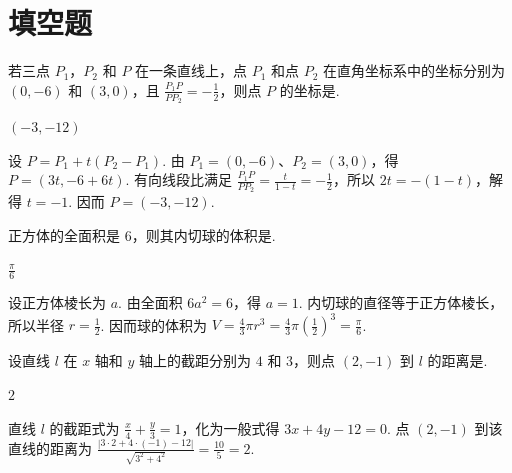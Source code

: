 \section{填空题}

\begin{problem}

若三点 \(P_{1}\)，\(P_{2}\) 和 \(P\) 在一条直线上，点 \(P_{1}\) 和点 \(P_{2}\) 在直角坐标系中的坐标分别为 \((0,-6)\) 和 \((3,0)\)，且 \(\frac{P_{1}P}{PP_{2}}=-\frac{1}{2}\)，则点 \(P\) 的坐标是\fillinblank{}.
\end{problem}

\begin{answer}
\(\left( -3,-12 \right)\)
\end{answer}

\begin{solution}
设 \(P=P_1+t(P_2-P_1)\). 由 \(P_1=(0,-6)\)、\(P_2=(3,0)\)，得 \(P=(3t,-6+6t)\). 有向线段比满足 \(\frac{P_1P}{PP_2}=\frac{t}{1-t}=-\frac12\)，所以 \(2t=-(1-t)\)，解得 \(t=-1\). 因而 \(P=(-3,-12)\).
\end{solution}

\begin{problem}

正方体的全面积是 \(6\)，则其内切球的体积是\fillinblank{}.
\end{problem}

\begin{answer}
\(\frac{\pi}{6}\)
\end{answer}

\begin{solution}
设正方体棱长为 \(a\). 由全面积 \(6a^2=6\)，得 \(a=1\). 内切球的直径等于正方体棱长，所以半径 \(r=\frac12\). 因而球的体积为 \(V=\frac43\pi r^3=\frac43\pi\left(\frac12\right)^3=\frac{\pi}{6}\).
\end{solution}

\begin{problem}

设直线 \(l\) 在 \(x\) 轴和 \(y\) 轴上的截距分别为 \(4\) 和 \(3\)，则点 \((2, -1)\) 到 \(l\) 的距离是\fillinblank{}.
\end{problem}

\begin{answer}
\(2\)
\end{answer}

\begin{solution}
直线 \(l\) 的截距式为 \(\frac{x}{4}+\frac{y}{3}=1\)，化为一般式得 \(3x+4y-12=0\). 点 \((2,-1)\) 到该直线的距离为 \(\frac{|3\cdot2+4\cdot(-1)-12|}{\sqrt{3^2+4^2}}=\frac{10}{5}=2\).
\end{solution}

